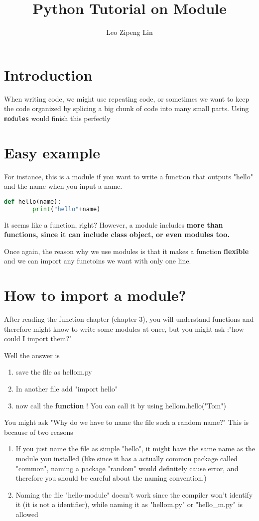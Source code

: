 \documentclass[12pt]{article}
\title{Python Tutorial on Module}
\author{Leo Zipeng Lin}
\begin{document}
\maketitle
\newpage
\section{Introduction}
\par When writing code, we might use repeating code, or sometimes we want to keep the code organized by splicing a big chunk of code into many small parts. Using \texttt{modules} would finish this perfectly
\section{Easy example}
For instance, this is a module if you want to write a function that outputs "hello" and the name when you input a name.

\begin{lstlisting}[language=Python,caption="Simple example of module
(function)", captionpos=b]
def hello(name):
		print("hello"+name)
\end{lstlisting}

It seems like a function, right? However, a module includes \textbf{more than functions, since it can include class object, or even modules too.}

Once again, the reason why we use modules is that it makes a function \textbf{flexible} and we can import any functoins we want with only one line.
\section{How to import a module?}
After reading the function chapter (chapter 3), you will understand functions and therefore might know to write some modules at once, but you might ask :"how could I import them?"

Well the answer is
\begin{enumerate}
	\item save the file as hellom.py
	\item In another file add "import hello"
	\item now call the \textbf{function} ! You can call it by using hellom.hello("Tom")
\end{enumerate}
		You might ask "Why do we have to name the file such a random name?" This is because of two reasons
		\begin{enumerate}
			\item If you just name the file as simple "hello", it might have the same name as the module you installed (like since it has a actually common package called "common", naming a package "random" would definitely cause error, and therefore you should be careful about the naming convention.)
			\item Naming the file "hello-module" doesn't work since the compiler won't identify it (it is not a identifier), while naming it as "hellom.py" or "hello\_m.py" is allowed
		\end{enumerate}
\end{document}
